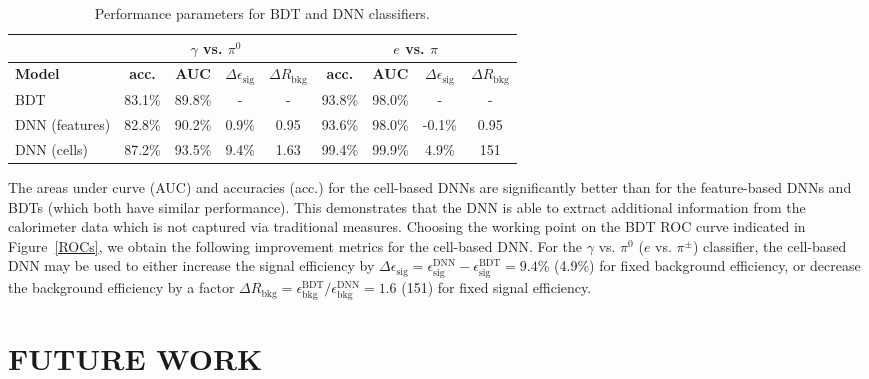 \begin{table}[!ht]
    \centering
    \begin{tabular}[!t]{l|cccc|cccc}
        \hline
        & \multicolumn{4}{c}{\textbf{$\gamma$ vs. $\pi^0$}} & \multicolumn{4}{c}{\textbf{$e$ vs. $\pi$}}\\
        \hline
        \textbf{Model} & \textbf{acc.} &  \textbf{AUC} & \textbf{$\Delta \epsilon_{\mathrm{sig}}$} & \textbf{$\Delta R_{\mathrm{bkg}}$} & \textbf{acc.} &  \textbf{AUC} & \textbf{$\Delta \epsilon_{\mathrm{sig}}$} & \textbf{$\Delta R_{\mathrm{bkg}}$} \\
        \hline
        \centering
        BDT & 83.1\% & 89.8\% & - & - & 93.8\% & 98.0\% & - & - \\
        DNN (features) & 82.8\% & 90.2\% & 0.9\% & 0.95 & 93.6\% & 98.0\% & -0.1\% & 0.95 \\
        DNN (cells) & 87.2\% & 93.5\% & 9.4\% & 1.63 & 99.4\% & 99.9\% & 4.9\% & 151 \\
        \hline
        \hline
    \end{tabular}
    \vspace{5pt}
    \caption{Performance parameters for BDT and DNN classifiers.} 
    \label{AUCs}
\end{table}

The areas under curve (AUC) and accuracies (acc.)
for the cell-based DNNs are significantly better than for the feature-based DNNs and BDTs (which both have similar performance). This demonstrates that the DNN is able to extract additional information from the calorimeter data which is not captured via traditional measures. Choosing the working point on the BDT ROC curve indicated in Figure~\ref{ROCs}, we obtain the following improvement metrics for the cell-based DNN. For the $\gamma$ vs. $\pi^0$ ($e$ vs. $\pi^\pm$) classifier, the cell-based DNN may be used to either increase the signal efficiency by $\Delta \epsilon_{\mathrm{sig}} = \epsilon_{\mathrm{sig}}^{\mathrm{DNN}} - \epsilon_{\mathrm{sig}}^{\mathrm{BDT}}=9.4$\% (4.9\%) for fixed background efficiency, or decrease the background efficiency by a factor $\Delta R_{\mathrm{bkg}} = \epsilon_{\mathrm{bkg}}^{\mathrm{BDT}} / \epsilon_{\mathrm{bkg}}^{\mathrm{DNN}}= 1.6$ (151) for fixed signal efficiency.

\section*{FUTURE WORK}

